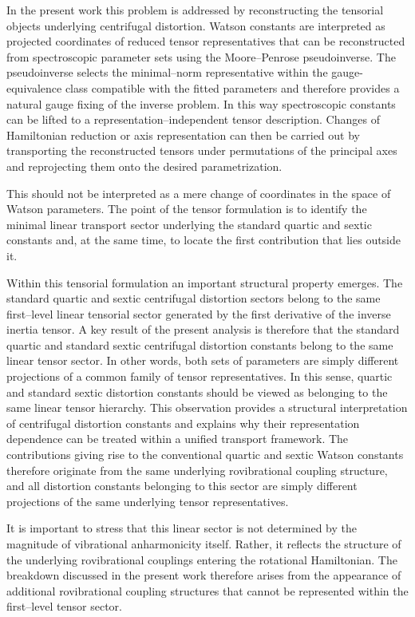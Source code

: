 \documentclass[journal=jacsat,manuscript=article]{achemso}
\begin{document}
In the present work this problem is addressed by reconstructing the
tensorial objects underlying centrifugal distortion.
Watson constants are interpreted as projected coordinates of reduced
tensor representatives that can be reconstructed from spectroscopic
parameter sets using the Moore--Penrose pseudoinverse.
The pseudoinverse selects the minimal--norm representative within the
gauge-equivalence class compatible with the fitted parameters and
therefore provides a natural gauge fixing of the inverse problem.
In this way spectroscopic constants can be lifted to a
representation--independent tensor description.
Changes of Hamiltonian reduction or axis representation can then be
carried out by transporting the reconstructed tensors under permutations
of the principal axes and reprojecting them onto the desired
parametrization.

This should not be interpreted as a mere change of coordinates in the
space of Watson parameters. The point of the tensor formulation is to
identify the minimal linear transport sector underlying the standard
quartic and sextic constants and, at the same time, to locate the first
contribution that lies outside it.

Within this tensorial formulation an important structural property
emerges.
The standard quartic and sextic centrifugal distortion sectors belong
to the same first--level linear tensorial sector generated by the first
derivative of the inverse inertia tensor.
A key result of the present analysis is therefore that the standard
quartic and standard sextic centrifugal distortion constants belong to
the same linear tensor sector. In other words, both sets of parameters
are simply different projections of a common family of tensor
representatives.
In this sense, quartic and standard sextic distortion constants should
be viewed as belonging to the same linear tensor hierarchy.
This observation provides a structural interpretation of centrifugal
distortion constants and explains why their representation dependence
can be treated within a unified transport framework.
The contributions giving rise to the conventional quartic and sextic
Watson constants therefore originate from the same underlying
rovibrational coupling structure, and all distortion constants
belonging to this sector are simply different projections of the same
underlying tensor representatives.

It is important to stress that this linear sector is not determined by
the magnitude of vibrational anharmonicity itself.
Rather, it reflects the structure of the underlying rovibrational
couplings entering the rotational Hamiltonian.
The breakdown discussed in the present work therefore arises from the
appearance of additional rovibrational coupling structures that cannot
be represented within the first--level tensor sector.
\end{document}

